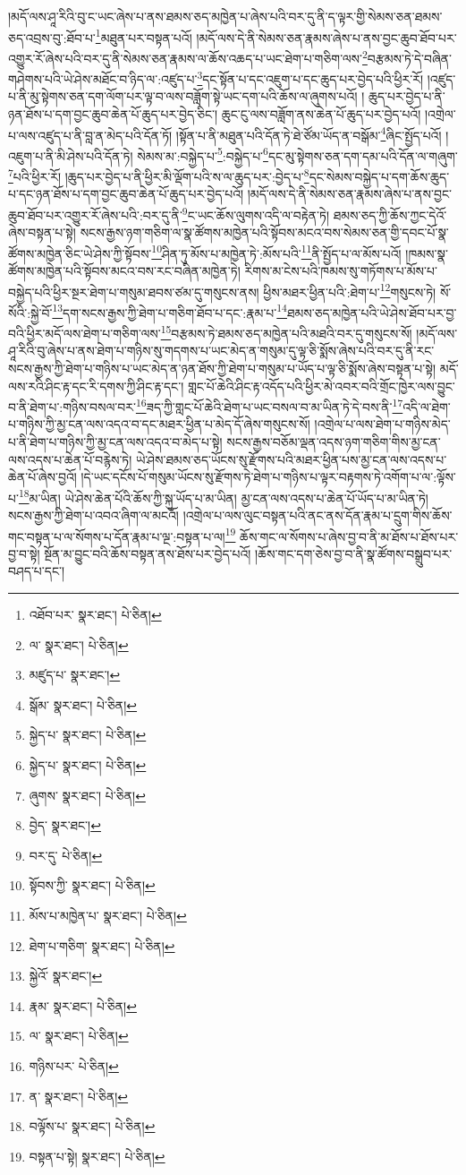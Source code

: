 །མདོ་ལས་ཤཱ་རིའི་བུ་ང་ཡང་ཞེས་པ་ནས་ཐམས་ཅད་མཁྱེན་པ་ཞེས་པའི་བར་དུ་ནི་ད་ལྟར་གྱི་སེམས་ཅན་ཐམས་ཅད་འབྲས་བུ་:ཐོབ་པ་\footnote{འཐོབ་པར་  སྣར་ཐང་།  པེ་ཅིན། }མཐུན་པར་བསྟན་པའོ། །མདོ་ལས་དེ་ནི་སེམས་ཅན་རྣམས་ཞེས་པ་ནས་བྱང་ཆུབ་ཐོབ་པར་འགྱུར་རོ་ཞེས་པའི་བར་དུ་ནི་སེམས་ཅན་རྣམས་ལ་ཆོས་འཆད་པ་ཡང་ཐེག་པ་གཅིག་ལས་\footnote{ལ་  སྣར་ཐང་།  པེ་ཅིན། }བརྩམས་ཏེ་དེ་བཞིན་གཤེགས་པའི་ཡེ་ཤེས་མཐོང་བ་ཉིད་ལ་:འཛུད་པ་\footnote{མཛུད་པ་  སྣར་ཐང་། }དང་སྟོན་པ་དང་འཇུག་པ་དང་ཆུད་པར་བྱེད་པའི་ཕྱིར་རོ། །འཛུད་པ་ནི་མུ་སྟེགས་ཅན་དག་ལོག་པར་ལྟ་བ་ལས་བཟློག་སྟེ་ཡང་དག་པའི་ཆོས་ལ་ཞུགས་པའོ། །
ཆུད་པར་བྱེད་པ་ནི་ཉན་ཐོས་པ་དག་བྱང་ཆུབ་ཆེན་པོ་ཆུད་པར་བྱེད་ཅིང་། ཆུང་ངུ་ལས་བཟློག་ནས་ཆེན་པོ་ཆུད་པར་བྱེད་པའོ། །འགྲེལ་པ་ལས་འཛུད་པ་ནི་བླ་ན་མེད་པའི་དོན་ཏོ། །སྟོན་པ་ནི་མཐུན་པའི་དོན་ཏེ་ཐེ་ཙོམ་ཡོད་ན་བསྒོམ་\footnote{སྒོམ་  སྣར་ཐང་།  པེ་ཅིན། }ཞིང་སྤྱོད་པའོ། །འཇུག་པ་ནི་མི་ཤེས་པའི་དོན་ཏེ། སེམས་མ་:བསྐྱེད་པ་\footnote{སྐྱེད་པ་  སྣར་ཐང་།  པེ་ཅིན། }:བསྐྱེད་པ་\footnote{སྐྱེད་པ་  སྣར་ཐང་།  པེ་ཅིན། }དང་མུ་སྟེགས་ཅན་དག་དམ་པའི་དོན་ལ་གཞུག་\footnote{ཞུགས་  སྣར་ཐང་།  པེ་ཅིན། }པའི་ཕྱིར་རོ། །ཆུད་པར་བྱེད་པ་ནི་ཕྱིར་མི་ལྡོག་པའི་ས་ལ་ཆུད་པར་:བྱེད་པ་\footnote{བྱེད་  སྣར་ཐང་། }དང་སེམས་བསྐྱེད་པ་དག་ཆོས་ཆུད་པ་དང་ཉན་ཐོས་པ་དག་བྱང་ཆུབ་ཆེན་པོ་ཆུད་པར་བྱེད་པའོ། །མདོ་ལས་དེ་ནི་སེམས་ཅན་རྣམས་ཞེས་པ་ནས་བྱང་ཆུབ་ཐོབ་པར་འགྱུར་རོ་ཞེས་པའི་:བར་དུ་ནི་\footnote{བར་དུ་  པེ་ཅིན། }ང་ཡང་ཆོས་ལུགས་འདི་ལ་བརྟེན་ཏེ། ཐམས་ཅད་ཀྱི་ཆོས་ཀྱང་དེའོ་ཞེས་བསྟན་པ་སྟེ། སངས་རྒྱས་ཉག་གཅིག་ལ་སྣ་ཚོགས་མཁྱེན་པའི་སྟོབས་མངའ་བས་སེམས་ཅན་གྱི་དབང་པོ་སྣ་ཚོགས་མཁྱེན་ཅིང་ཡེ་ཤེས་ཀྱི་སྟོབས་\footnote{སྟོབས་ཀྱི་  སྣར་ཐང་།  པེ་ཅིན། }ཤིན་ཏུ་མོས་པ་མཁྱེན་ཏེ་:མོས་པའི་\footnote{མོས་པ་མཁྱེན་པ་  སྣར་ཐང་།  པེ་ཅིན། }ནི་སྤྱོད་པ་ལ་མོས་པའོ། །ཁམས་སྣ་ཚོགས་མཁྱེན་པའི་སྟོབས་མངའ་བས་རང་བཞིན་མཁྱེན་ཏེ། རིགས་མ་ངེས་པའི་ཁམས་སུ་གཏོགས་པ་མོས་པ་བསྐྱེད་པའི་ཕྱིར་སྔར་ཐེག་པ་གསུམ་ཐབས་ཙམ་དུ་གསུངས་ནས། ཕྱིས་མཐར་ཕྱིན་པའི་:ཐེག་པ་\footnote{ཐེག་པ་གཅིག་  སྣར་ཐང་།  པེ་ཅིན། }གསུངས་ཏེ། སོ་སོའི་:སྐྱེ་བོ་\footnote{སྐྱེའོ་  སྣར་ཐང་། }དག་སངས་རྒྱས་ཀྱི་ཐེག་པ་གཅིག་ཐོབ་པ་དང་:རྣམ་པ་\footnote{རྣམ་  སྣར་ཐང་།  པེ་ཅིན། }ཐམས་ཅད་མཁྱེན་པའི་ཡེ་ཤེས་ཐོབ་པར་བྱ་བའི་ཕྱིར་མདོ་ལས་ཐེག་པ་གཅིག་ལས་\footnote{ལ་  སྣར་ཐང་།  པེ་ཅིན། }བརྩམས་ཏེ་ཐམས་ཅད་མཁྱེན་པའི་མཐའི་བར་དུ་གསུངས་སོ། །མདོ་ལས་ཤཱ་རིའི་བུ་ཞེས་པ་ནས་ཐེག་པ་གཉིས་སུ་གདགས་པ་ཡང་མེད་ན་གསུམ་དུ་ལྟ་ཅི་སྨོས་ཞེས་པའི་བར་དུ་ནི་རང་སངས་རྒྱས་ཀྱི་ཐེག་པ་གཉིས་པ་ཡང་མེད་ན་ཉན་ཐོས་ཀྱི་ཐེག་པ་གསུམ་པ་ཡོད་པ་ལྟ་ཅི་སྨོས་ཞེས་བསྟན་པ་སྟེ། མདོ་ལས་རའི་ཤིང་རྟ་དང་རི་དགས་ཀྱི་ཤིང་རྟ་དང་། གླང་པོ་ཆེའི་ཤིང་རྟ་འདོད་པའི་ཕྱིར་མེ་འབར་བའི་གྲོང་ཁྱེར་ལས་བྱུང་བ་ནི་ཐེག་པ་:གཉིས་བསལ་བར་\footnote{གཉིས་པར་  པེ་ཅིན། }ཟད་ཀྱི་གླང་པོ་ཆེའི་ཐེག་པ་ཡང་བསལ་བ་མ་ཡིན་ཏེ་དེ་བས་ནི་\footnote{ན་  སྣར་ཐང་།  པེ་ཅིན། }འདི་ལ་ཐེག་པ་གཉིས་ཀྱི་མྱ་ངན་ལས་འདའ་བ་དང་མཐར་ཕྱིན་པ་མེད་དོ་ཞེས་གསུངས་སོ། །འགྲེལ་པ་ལས་ཐེག་པ་གཉིས་མེད་པ་ནི་ཐེག་པ་གཉིས་ཀྱི་མྱ་ངན་ལས་འདའ་བ་མེད་པ་སྟེ། སངས་རྒྱས་བཅོམ་ལྡན་འདས་ཉག་གཅིག་གིས་མྱ་ངན་ལས་འདས་པ་ཆེན་པོ་བརྙེས་ཏེ། ཡེ་ཤེས་ཐམས་ཅད་ཡོངས་སུ་རྫོགས་པའི་མཐར་ཕྱིན་པས་མྱ་ངན་ལས་འདས་པ་ཆེན་པོ་ཞེས་བྱའོ། །དེ་ཡང་དངོས་པོ་གསུམ་ཡོངས་སུ་རྫོགས་ཏེ་ཐེག་པ་གཉིས་པ་ལྟར་བརྟགས་ཏེ་འགོག་པ་ལ་:ལྟོས་པ་\footnote{བལྟོས་པ་  སྣར་ཐང་།  པེ་ཅིན། }མ་ཡིན། ཡེ་ཤེས་ཆེན་པོའི་ཆོས་ཀྱི་སྐུ་ཡོད་པ་མ་ཡིན། མྱ་ངན་ལས་འདས་པ་ཆེན་པོ་ཡོད་པ་མ་ཡིན་ཏེ། སངས་རྒྱས་ཀྱི་ཐེག་པ་འབའ་ཞིག་ལ་མངའོ། །འགྲེལ་པ་ལས་ལུང་བསྟན་པའི་ནང་ནས་དོན་རྣམ་པ་དྲུག་གིས་ཆོས་གང་བསྟན་པ་ལ་སོགས་པ་དོན་རྣམ་པ་ལྔ་:བསྟན་པ་ལ།\footnote{བསྟན་པ་སྟེ།  སྣར་ཐང་།  པེ་ཅིན། } ཆོས་གང་ལ་སོགས་པ་ཞེས་བྱ་བ་ནི་མ་ཐོས་པ་ཐོས་པར་བྱ་བ་སྟེ། སྔོན་མ་བྱུང་བའི་ཆོས་བསྟན་ནས་ཐོས་པར་བྱེད་པའོ། །ཆོས་གང་དག་ཅེས་བྱ་བ་ནི་སྣ་ཚོགས་བསྒྲུབ་པར་བཤད་པ་དང་། 